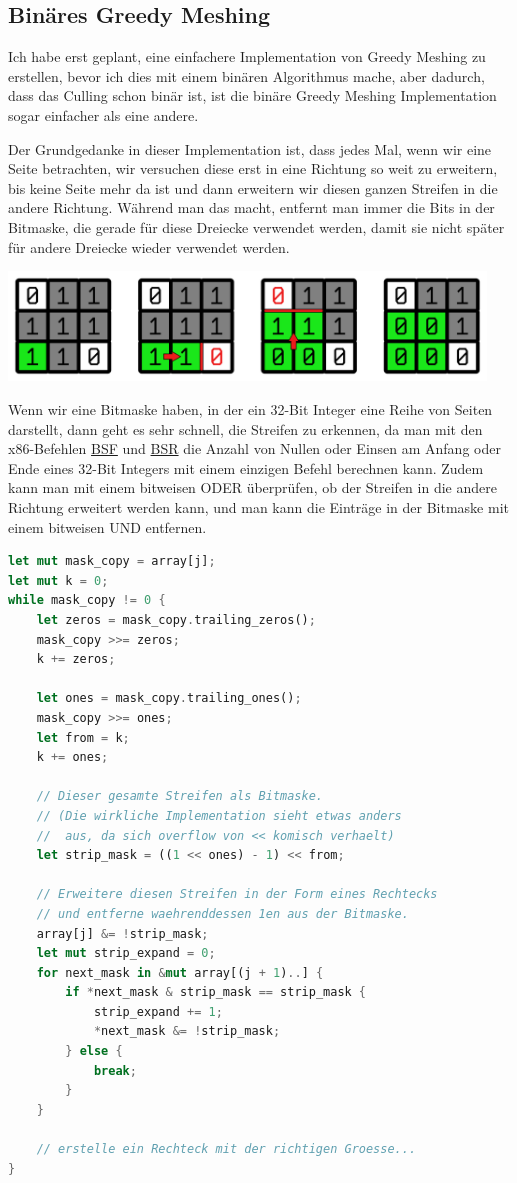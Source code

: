 \subsection{Binäres Greedy Meshing}

Ich habe erst geplant, eine einfachere Implementation
von Greedy Meshing zu erstellen, bevor ich dies mit
einem binären Algorithmus mache, aber dadurch,
dass das Culling schon binär ist, ist die binäre
Greedy Meshing Implementation sogar einfacher als
eine andere.

Der Grundgedanke in dieser Implementation ist,
dass jedes Mal, wenn wir eine Seite betrachten,
wir versuchen diese erst in eine Richtung so weit
zu erweitern, bis keine Seite mehr da ist und dann
erweitern wir diesen ganzen Streifen in die andere
Richtung.
Während man das macht, entfernt man immer die
Bits in der Bitmaske, die gerade für diese Dreiecke
verwendet werden, damit sie nicht später für andere
Dreiecke wieder verwendet werden.

\begin{center}
\includegraphics[width=0.95\textwidth]{../assets/greedy/grid_visualization.png}
\end{center}

Wenn wir eine Bitmaske haben, in der ein
32-Bit Integer eine Reihe von Seiten darstellt,
dann geht es sehr schnell, die Streifen zu erkennen,
da man mit den x86-Befehlen
\href{https://www.felixcloutier.com/x86/bsf}{BSF} \cite{bsf}
und
\href{https://www.felixcloutier.com/x86/bsr}{BSR} \cite{bsr}
die Anzahl von Nullen oder Einsen am Anfang oder
Ende eines 32-Bit Integers mit einem einzigen
Befehl berechnen kann.
Zudem kann man mit einem bitweisen ODER
überprüfen, ob der Streifen in die andere Richtung
erweitert werden kann, und man kann die Einträge
in der Bitmaske mit einem bitweisen UND entfernen.

\begin{lstlisting}[language=Rust]
let mut mask_copy = array[j];
let mut k = 0;
while mask_copy != 0 {
	let zeros = mask_copy.trailing_zeros();
	mask_copy >>= zeros;
	k += zeros;

	let ones = mask_copy.trailing_ones();
	mask_copy >>= ones;
	let from = k;
	k += ones;

	// Dieser gesamte Streifen als Bitmaske.
	// (Die wirkliche Implementation sieht etwas anders
	//  aus, da sich overflow von << komisch verhaelt)
	let strip_mask = ((1 << ones) - 1) << from;

	// Erweitere diesen Streifen in der Form eines Rechtecks
	// und entferne waehrenddessen 1en aus der Bitmaske.
	array[j] &= !strip_mask;
	let mut strip_expand = 0;
	for next_mask in &mut array[(j + 1)..] {
		if *next_mask & strip_mask == strip_mask {
			strip_expand += 1;
			*next_mask &= !strip_mask;
		} else {
			break;
		}
	}

	// erstelle ein Rechteck mit der richtigen Groesse...
}
\end{lstlisting}

